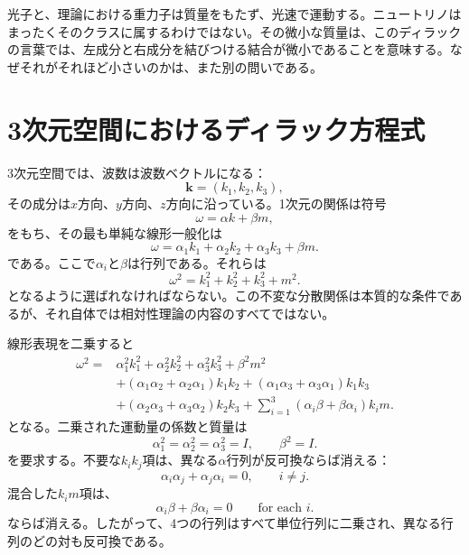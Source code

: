 光子と、理論における重力子は質量をもたず、光速で運動する。ニュートリノはまったくそのクラスに属するわけではない。その微小な質量は、このディラックの言葉では、左成分と右成分を結びつける結合が微小であることを意味する。なぜそれがそれほど小さいのかは、また別の問いである。

\section{3次元空間におけるディラック方程式}

3次元空間では、波数は波数ベクトルになる：
\begin{equation}
\mathbf{k}=(k_1,k_2,k_3),
\end{equation}
その成分は\(x\)方向、\(y\)方向、\(z\)方向に沿っている。1次元の関係は符号
\begin{equation}
\omega=\alpha k+\beta m,
\end{equation}
をもち、その最も単純な線形一般化は
\begin{equation}
\omega
=
\alpha_1 k_1+\alpha_2 k_2+\alpha_3 k_3+\beta m.
\end{equation}
である。ここで\(\alpha_i\)と\(\beta\)は行列である。それらは
\begin{equation}
\omega^2=k_1^2+k_2^2+k_3^2+m^2.
\end{equation}
となるように選ばれなければならない。この不変な分散関係は本質的な条件であるが、それ自体では相対性理論の内容のすべてではない。

線形表現を二乗すると
\begin{align}
\omega^2
={}&
\alpha_1^2k_1^2+\alpha_2^2k_2^2+\alpha_3^2k_3^2+\beta^2m^2
\nonumber\\
&+(\alpha_1\alpha_2+\alpha_2\alpha_1)k_1k_2
+(\alpha_1\alpha_3+\alpha_3\alpha_1)k_1k_3
\nonumber\\
&+(\alpha_2\alpha_3+\alpha_3\alpha_2)k_2k_3
+\sum_{i=1}^{3}(\alpha_i\beta+\beta\alpha_i)k_i m.
\end{align}
となる。二乗された運動量の係数と質量は
\begin{equation}
\alpha_1^2=\alpha_2^2=\alpha_3^2=I,
\qquad
\beta^2=I.
\end{equation}
を要求する。不要な\(k_i k_j\)項は、異なる\(\alpha\)行列が反可換ならば消える：
\begin{equation}
\alpha_i\alpha_j+\alpha_j\alpha_i=0,
\qquad i\neq j.
\end{equation}
混合した\(k_i m\)項は、
\begin{equation}
\alpha_i\beta+\beta\alpha_i=0
\qquad
\text{for each }i.
\end{equation}
ならば消える。したがって、4つの行列はすべて単位行列に二乗され、異なる行列のどの対も反可換である。

